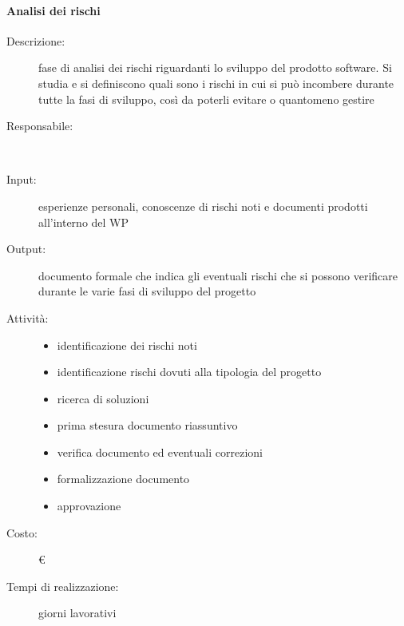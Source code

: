 \paragraph{Analisi dei rischi}
\begin{description}
\item[Descrizione:] fase di analisi dei rischi riguardanti lo sviluppo del prodotto software. Si
studia e si definiscono quali sono i rischi in cui si può incombere durante tutte la fasi di
sviluppo, così da poterli evitare o quantomeno gestire\\

\item[Responsabile:] \\

\item[Input:] esperienze personali, conoscenze di rischi noti e documenti prodotti all’interno
del WP\\

\item[Output:] documento formale che indica gli eventuali rischi che si possono verificare
durante le varie fasi di sviluppo del progetto\\

\item[Attività:]
\begin{itemize}
\item identificazione dei rischi noti
\item identificazione rischi dovuti alla tipologia del progetto
\item ricerca di soluzioni
\item prima stesura documento riassuntivo
\item verifica documento ed eventuali correzioni
\item formalizzazione documento
\item approvazione
\end{itemize}
\item[Costo:] \euro \\
\item[Tempi di realizzazione:]  giorni lavorativi
\end{description}


